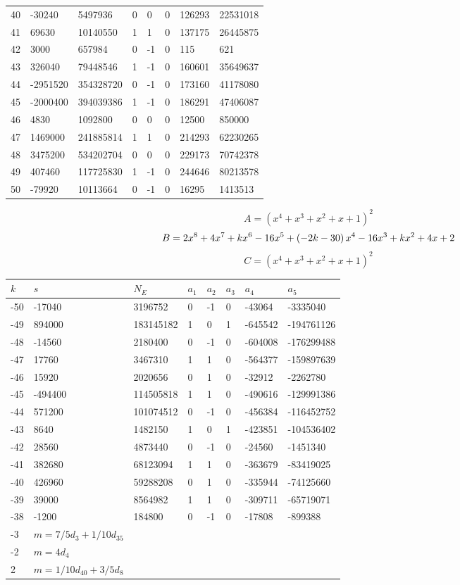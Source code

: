 \documentclass{amsart}
\begin{document}
\begin{longtable}{|l|l|l|lllll|}
40&-30240&5497936&0&0&0&126293&22531018\\
41&69630&10140550&1&1&0&137175&26445875\\
42&3000&657984&0&-1&0&115&621\\
43&326040&79448546&1&-1&0&160601&35649637\\
44&-2951520&354328720&0&-1&0&173160&41178080\\
45&-2000400&394039386&1&-1&0&186291&47406087\\
46&4830&1092800&0&0&0&12500&850000\\
47&1469000&241885814&1&1&0&214293&62230265\\
48&3475200&534202704&0&0&0&229173&70742378\\
49&407460&117725830&1&-1&0&244646&80213578\\
50&-79920&10113664&0&-1&0&16295&1413513\\
\hline
\end{longtable}
$$A=(x^4
 + x^3
 + x^2
 + x
 + 1)^{2}$$
$$B=2\*x^8
 + 4\*x^7
 + k\*x^6
 - 16\*x^5
 + \left(-2\*k
 - 30\right) \*x^4
 - 16\*x^3
 + k\*x^2
 + 4\*x
 + 2$$
$$C=(x^4
 + x^3
 + x^2
 + x
 + 1)^{2}$$
\begin{longtable}{|l|l|l|lllll|}
\hline
$k$ & $s$ & $N_E$ & $a_1$ & $a_2$ & $a_3$ & $a_4$ & $a_5$\\
\hline
-50&-17040&3196752&0&-1&0&-43064&-3335040\\
-49&894000&183145182&1&0&1&-645542&-194761126\\
-48&-14560&2180400&0&-1&0&-604008&-176299488\\
-47&17760&3467310&1&1&0&-564377&-159897639\\
-46&15920&2020656&0&1&0&-32912&-2262780\\
-45&-494400&114505818&1&1&0&-490616&-129991386\\
-44&571200&101074512&0&-1&0&-456384&-116452752\\
-43&8640&1482150&1&0&1&-423851&-104536402\\
-42&28560&4873440&0&-1&0&-24560&-1451340\\
-41&382680&68123094&1&1&0&-363679&-83419025\\
-40&426960&59288208&0&1&0&-335944&-74125660\\
-39&39000&8564982&1&1&0&-309711&-65719071\\
-38&-1200&184800&0&-1&0&-17808&-899388\\
-3&$m=7/5d_{3}+1/10d_{35}$&&\multicolumn{5}{c|}{}\\
-2&$m=4d_{4}$&&\multicolumn{5}{c|}{}\\
2&$m=1/10d_{40}+3/5d_{8}$&&\multicolumn{5}{c|}{}\\
\hline
\end{longtable}
\end{document}
